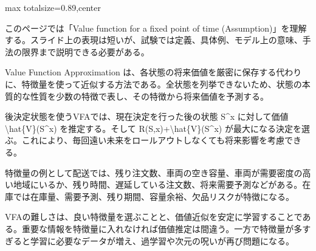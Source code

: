 \begin{minipage}[t]{0.58\textwidth}
\begin{adjustbox}{max totalsize={\textwidth}{0.89\textheight},center}
\begin{minipage}{\textwidth}\scriptsize
{}このページでは「Value function for a fixed point of time (Assumption)」を理解する。スライド上の表現は短いが、試験では定義、具体例、モデル上の意味、手法の限界まで説明できる必要がある。\par
Value Function Approximation は、各状態の将来価値を厳密に保存する代わりに、特徴量を使って近似する方法である。全状態を列挙できないため、状態の本質的な性質を少数の特徴で表し、その特徴から将来価値を予測する。\par
後決定状態を使うVFAでは、現在決定を行った後の状態 S\textasciicircum{}x に対して価値 \textbackslash{}hat\{V\}(S\textasciicircum{}x) を推定する。そして R(S,x)+\textbackslash{}hat\{V\}(S\textasciicircum{}x) が最大になる決定を選ぶ。これにより、毎回遠い未来をロールアウトしなくても将来影響を考慮できる。\par
特徴量の例として配送では、残り注文数、車両の空き容量、車両が需要密度の高い地域にいるか、残り時間、遅延している注文数、将来需要予測などがある。在庫では在庫量、需要予測、残り期間、容量余裕、欠品リスクが特徴になる。\par
VFAの難しさは、良い特徴量を選ぶことと、価値近似を安定に学習することである。重要な情報を特徴量に入れなければ価値推定は間違う。一方で特徴量が多すぎると学習に必要なデータが増え、過学習や次元の呪いが再び問題になる。\par

\end{minipage}
\end{adjustbox}
\end{minipage}
